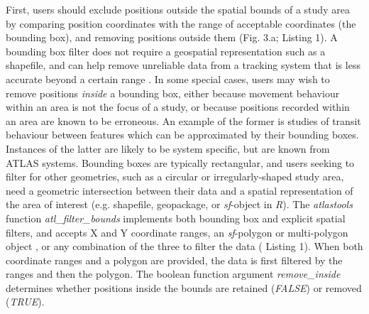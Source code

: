 \begin{refsection}[sorting=nyt]
    First, users should exclude positions outside the spatial bounds of a study area by comparing position coordinates with the range of acceptable coordinates (the bounding box), and removing positions outside them (Fig. 3.a; {\color{red} Listing} 1). 
    A bounding box filter does not require a geospatial representation such as a shapefile, and can help remove unreliable data from a tracking system that is less accurate beyond a certain range \citep[][]{beardsworth2021}.
    In some special cases, users may wish to remove positions \textit{inside} a bounding box, either because movement behaviour within an area is not the focus of a study, or because positions recorded within an area are known to be erroneous.
    An example of the former is studies of transit behaviour between features which can be approximated by their bounding boxes. 
    Instances of the latter are likely to be system specific, but are known from ATLAS systems. 
    Bounding boxes are typically rectangular, and users seeking to filter for other geometries, such as a circular or irregularly-shaped study area, need a geometric intersection between their data and a spatial representation of the area of interest (e.g. shapefile, geopackage, or \textit{sf}-object in \textit{R}).
    The \textit{atlastools} function \textit{atl\_filter\_bounds} implements both bounding box and explicit spatial filters, and accepts X and Y coordinate ranges, an \textit{sf}-polygon or multi-polygon object \citep{pebesma2018}, or any combination of the three to filter the data ({\color{red} Listing} 1).
    When both coordinate ranges and a polygon are provided, the data is first filtered by the ranges and then the polygon.
    The boolean function argument \textit{remove\_inside} determines whether positions inside the bounds are retained (\textit{FALSE}) or removed (\textit{TRUE}).



\end{refsection}
